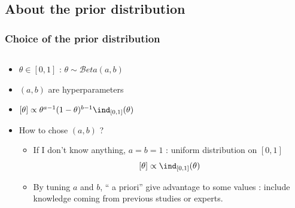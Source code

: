 
\subsection{About the prior distribution}
\begin{frame}\frametitle{Choice of the prior distribution}
 \begin{columns}[t]
 \begin{column}{0.55\linewidth} 
  \begin{block}{}
\begin{itemize}
\item $\theta \in [0,1]$ :  $\theta \sim \mathcal{B}eta(a, b)$
\item $(a,b)$ are  hyperparameters
\item $ [\theta]  \propto  \theta^{a-1} (1-\theta)^{b-1} \ind_{[0,1]}(\theta)$ 
\item \vert How to chose $(a,b)$ ?  %
\noir
\begin{itemize}
\item  If I don't know anything,  $a=b=1$ :  uniform distribution on $[0,1]$
 $$[\theta] \propto \ind_{[0,1]}(\theta)$$
 \item By tuning $a$ and $b$,  `` a priori'' give advantage to some values :  include  knowledge coming from previous studies or experts. 
 
\end{itemize}
\end{itemize}
 \end{block} 
  \end{column}
  

\end{columns}
\end{frame}
